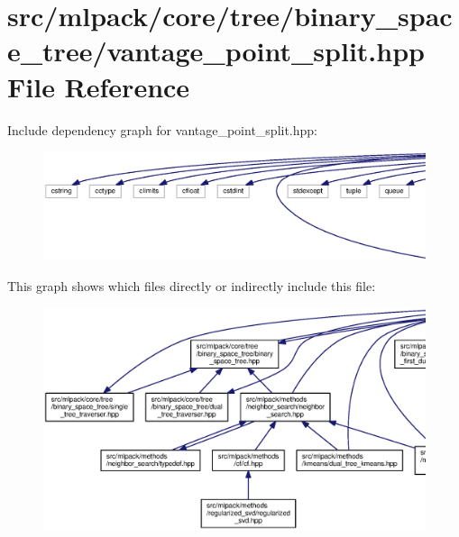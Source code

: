 \section{src/mlpack/core/tree/binary\+\_\+space\+\_\+tree/vantage\+\_\+point\+\_\+split.hpp File Reference}
\label{vantage__point__split_8hpp}
Include dependency graph for vantage\+\_\+point\+\_\+split.\+hpp\+:
\nopagebreak
\begin{figure}[H]
\begin{center}
\leavevmode
\includegraphics[width=350pt]{vantage__point__split_8hpp__incl}
\end{center}
\end{figure}
This graph shows which files directly or indirectly include this file\+:
\nopagebreak
\begin{figure}[H]
\begin{center}
\leavevmode
\includegraphics[width=350pt]{vantage__point__split_8hpp__dep__incl}
\end{center}
\end{figure}
